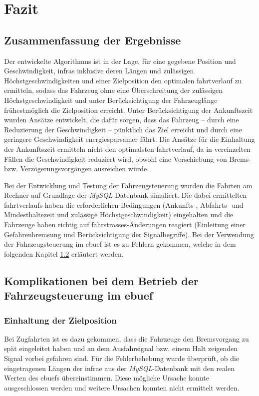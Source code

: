 \section{Fazit}
\subsection{Zusammenfassung der Ergebnisse}
Der entwickelte Algorithmus ist in der Lage, für eine gegebene Position und Geschwindigkeit, \acp{infra} inklusive deren Längen und zulässigen Höchstgeschwindigkeiten und einer Zielposition den optimalen \Gls{fahrtverlauf} zu ermitteln, sodass das Fahrzeug ohne eine Überschreitung der zulässigen Höchstgeschwindigkeit und unter Berücksichtigung der Fahrzeuglänge frühestmöglich die Zielposition erreicht. Unter Berücksichtigung der Ankunftszeit wurden Ansätze entwickelt, die dafür sorgen, dass das Fahrzeug -- durch eine Reduzierung der Geschwindigkeit -- pünktlich das Ziel erreicht und durch eine geringere Geschwindigkeit energiesparsamer fährt. Die Ansätze für die Einhaltung der Ankunftszeit ermitteln nicht den optimalsten \Gls{fahrtverlauf}, da in vereinzelten Fällen die Geschwindigkeit reduziert wird, obwohl eine Verschiebung von Brems- bzw. Verzögerungsvorgängen ausreichen würde.

Bei der Entwicklung und Testung der Fahrzeugsteuerung wurden die Fahrten am Rechner auf Grundlage der \textit{MySQL}-Datenbank simuliert. Die dabei ermittelten \Glspl{fahrtverlauf} haben die erforderlichen Bedingungen (Ankunfts-, Abfahrts- und Mindesthaltezeit und zulässige Höchstgeschwindigkeit) eingehalten und die Fahrzeuge haben richtig auf \Glspl{fahrstrasse}-Änderungen reagiert (Einleitung einer Gefahrenbremsung und Berücksichtigung der Signalbegriffe). Bei der Verwendung der Fahrzeugsteuerung im \ac{ebuef} ist es zu Fehlern gekommen, welche in dem folgenden Kapitel \ref{fazit2} erläutert werden.
\subsection{Komplikationen bei dem Betrieb der Fahrzeugsteuerung im \ac{ebuef}} \label{fazit2}
\subsubsection{Einhaltung der Zielposition}
Bei Zugfahrten ist es dazu gekommen, dass die Fahrzeuge den Bremsvorgang zu spät eingeleitet haben und an dem Ausfahrsignal bzw. einem Halt zeigenden Signal vorbei gefahren sind. Für die Fehlerbehebung wurde überprüft, ob die eingetragenen Längen der \ac{infra}e aus der \textit{MySQL}-Datenbank mit den realen Werten des \acp{ebuef} übereinstimmen. Diese mögliche Ursache konnte ausgeschlossen werden und weitere Ursachen konnten nicht ermittelt werden.
